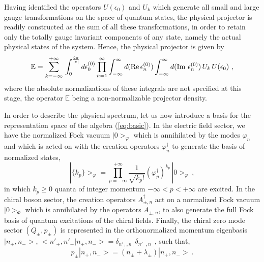\documentclass[a4paper,11pt]{article}
\def\proj{\mathbb E}
\begin{document}
Having identified the operators $U(\epsilon_0)$ and $U_k$ which generate
all small and large gauge transformations on the space of quantum states,
the physical projector is readily constructed as the sum of all these
transformations,\cite{Klauder} in order to retain only the totally gauge 
invariant components of any state,\cite{Gov1} namely the actual physical 
states of the system. Hence, the physical projector is given by
\begin{equation}
\proj=\sum_{k=-\infty}^{+\infty}\,\int_0^{\frac{2\pi}{|e|}}d\epsilon^{(0)}_0
\prod_{n=1}^\infty\int_{-\infty}^\infty d({\rm Re}\,\epsilon^{(0)}_n)
\int_{-\infty}^\infty d({\rm Im}\ \epsilon^{(0)}_n)\,
U_k\,U(\epsilon_0)\ ,
\end{equation}
where the absolute normalizations of these integrals are not specified
at this stage, the operator $\proj$ being a non-normalizable projector density.

In order to describe the physical spectrum, let us now introduce a basis
for the representation space of the algebra (\ref{eq:basic}). In the
electric field sector, we have the normalized Fock vacuum $|0>_\varphi$ 
which is annihilated by the modes $\varphi_n$ and
which is acted on with the creation operators $\varphi^\dagger_n$ to generate 
the basis of normalized states,
\begin{equation}
|\{k_p\}>_\varphi=\prod_{p=-\infty}^{+\infty}
\frac{1}{\sqrt{k_p!}}\left(\varphi^\dagger_p\right)^{k_p}\,
|0>_\varphi\ ,
\end{equation}
in which $k_p\ge 0$ quanta of integer momentum $-\infty<p<+\infty$ are 
excited. In the chiral boson sector, the creation operators 
$A^\dagger_{\pm,n}$ act on a normalized Fock vacuum $|0>_\Phi$ which is 
annihilated by the operators $A_{\pm,n}$, to also generate the full Fock 
basis of quantum excitations of the chiral fields. Finally, the chiral 
zero mode sector $(Q_\pm,p_\pm)$ is represented in the orthonormalized 
momentum eigenbasis $|n_+,n_->$, 
$<n'_+,n'_-|n_+,n_->=\delta_{n'_+,n_+}\delta_{n'_-,n_-}$, such that,
\begin{equation}
p_\pm|n_+,n_->=(n_\pm+\lambda_\pm)|n_+,n_->\ .
\end{equation}
\end{document}
